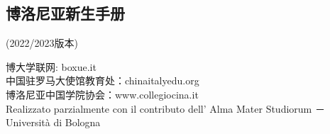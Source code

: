 
\begin{titlepage}                  
% 


\topmargin=-2cm   
\chapter*{博洛尼亚新生手册}                 %
\pagestyle{empty}%
\thispagestyle{empty} 
	\begin{center}
	(2022/2023版本)
	\end{center}



\vspace*{12cm}
\begin{center}
博大学联网: boxue.it\\
中国驻罗马大使馆教育处：chinaitalyedu.org\\
博洛尼亚中国学院协会：www.collegiocina.it\\
Realizzato parzialmente con il contributo dell'
Alma Mater Studiorum － Universit\`a di Bologna
\end{center}


\end{titlepage}

